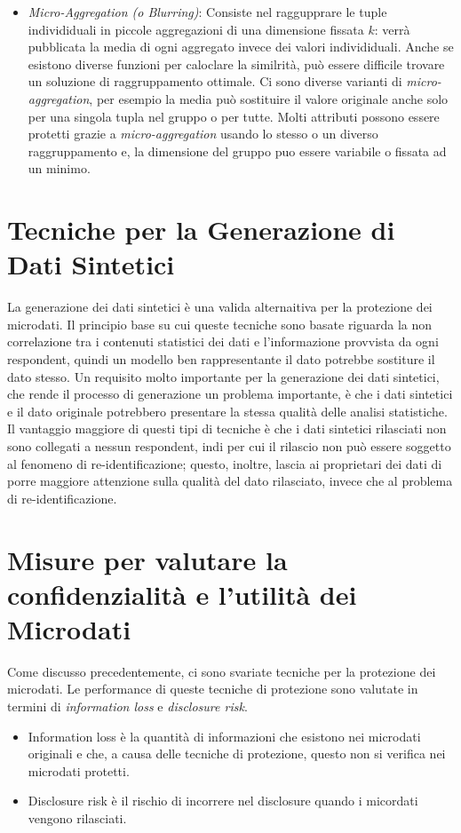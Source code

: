 \begin{itemize}
    \item \textit{Micro-Aggregation (o Blurring)}: Consiste nel raggupprare le tuple individiduali in piccole aggregazioni di una dimensione fissata $k$: verrà pubblicata la media di ogni aggregato invece dei valori individiduali. Anche se esistono diverse funzioni per caloclare la similrità, può essere difficile trovare un soluzione di raggruppamento ottimale. 
    Ci sono diverse varianti di \textit{micro-aggregation}, per esempio la media può sostituire il valore originale anche solo per una singola tupla nel gruppo o per tutte.
    Molti attributi possono essere protetti grazie a \textit{micro-aggregation} usando lo stesso o un diverso raggruppamento e, la dimensione del gruppo puo essere variabile o fissata ad un minimo. 
\end{itemize}
    
\section{Tecniche per la Generazione di Dati Sintetici}
La generazione dei dati sintetici è una valida alternaitiva per la protezione dei microdati. Il principio base su cui queste tecniche sono basate riguarda la non correlazione tra i contenuti statistici dei dati e l'informazione provvista da ogni respondent, quindi un modello ben rappresentante il dato potrebbe sostiture il dato stesso. Un requisito molto importante per la generazione dei dati sintetici, che rende il processo di generazione un problema importante, è che i dati sintetici e il dato originale potrebbero presentare la stessa qualità delle analisi statistiche. Il vantaggio maggiore di questi tipi di tecniche è che i dati sintetici rilasciati non sono collegati a nessun respondent, indi per cui il rilascio non può essere soggetto al fenomeno di re-identificazione; questo, inoltre, lascia ai proprietari dei dati di porre maggiore attenzione sulla qualità del dato rilasciato, invece che al problema di re-identificazione.

\section{Misure per valutare la confidenzialità e l'utilità dei Microdati}
Come discusso precedentemente, ci sono svariate tecniche per la protezione dei microdati. Le performance di queste tecniche di protezione sono valutate in termini di \textit{information loss} e \textit{disclosure risk}.
\begin{itemize}
    \item Information loss è la quantità di informazioni che esistono nei microdati originali e che, a causa delle tecniche di protezione, questo non si verifica nei microdati protetti.
    \item Disclosure risk è il rischio di incorrere nel disclosure quando i micordati vengono rilasciati.
\end{itemize}

